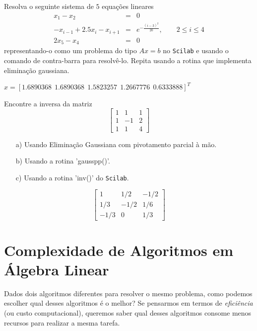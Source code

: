 \fi

\ifisscilab
\begin{Exercise}\label{trid} Resolva o seguinte sistema de $5$ equações lineares
\begin{eqnarray*}
x_1-x_2&=&0\\
-x_{i-1}+2.5x_i-x_{i+1}&=&e^{-\frac{(i-3)^2}{20}},\qquad 2\leq i \leq 4\\
2x_{5}-x_{4}&=&0
\end{eqnarray*}
representando-o como um problema do tipo $Ax=b$ no \verb+Scilab+ e usando o comando de contra-barra para resolvê-lo. Repita usando a rotina que implementa eliminação gaussiana.
\end{Exercise}
\begin{Answer}
  \begin{tiny}
 $x=[ 1.6890368  ~~  1.6890368  ~~  1.5823257  ~~  1.2667776   ~~ 0.6333888]^{T}$    
  \end{tiny}
\end{Answer}
\fi

\ifisscilab
\begin{Exercise} Encontre a inversa da matriz
$$\left[
\begin{array}{ccc}
1&1&1\\
1&-1&2\\
1&1&4
\end{array}\right]$$
\begin{itemize}
\item[a)] Usando Eliminação Gaussiana com pivotamento parcial à mão.
\item[b)] Usando a rotina 'gausspp()'.
\item[c)] Usando a rotina 'inv()' do \verb+Scilab+.
\end{itemize}
\end{Exercise}
\begin{Answer}
  \begin{tiny}
 $$ \left[ \begin {array}{ccc} 1&1/2&-1/2\\1/3&-1/2&1/6
\\-1/3&0&1/3\end {array} \right] $$    
  \end{tiny}
\end{Answer}
\fi



\section{Complexidade de Algoritmos em Álgebra Linear}
Dados dois algoritmos diferentes para resolver o mesmo problema, como podemos escolher qual desses algoritmos é o melhor? Se pensarmos em termos de \emph{eficiência} (ou custo computacional), queremos saber qual desses algoritmos consome menos recursos para realizar a mesma tarefa.

